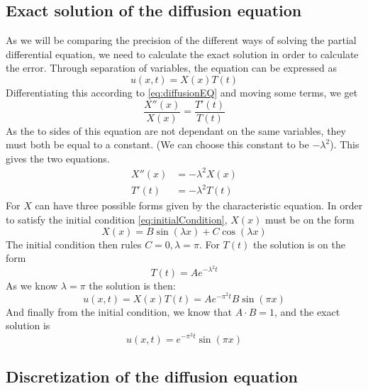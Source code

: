 \subsection{Exact solution of the diffusion equation}
As we will be comparing the precision of the different ways of solving the partial differential equation, we need to calculate the exact solution in order to calculate the error.
Through separation of variables, the equation can be expressed as
\begin{equation}
u(x,t) = X(x)T(t)
\label{eq:separated}
\end{equation}
Differentiating this according to \eqref{eq:diffusionEQ} and moving some terms, we get
\begin{equation*}
\frac{X''(x)}{X(x)} = \frac{T'(t)}{T(t)}
\end{equation*}
As the to sides of this equation are not dependant on the same variables, they must both be equal to a constant. (We can choose this constant to be $-\lambda ^2$). This gives the two equations.
\begin{equation*}
\begin{split}
X''(x) &= -\lambda ^2 X(x) \\
T'(t) &= -\lambda^2 T(t)
\end{split}
\end{equation*}
For $X$ can have three possible forms given by the characteristic equation. In order to satisfy the initial condition \eqref{eq:initialCondition}, $X(x)$ must be on the form
\begin{equation*}
X(x) = B\sin(\lambda x) + C\cos(\lambda x)
\end{equation*}
The initial condition then rules $C=0, \lambda = \pi$. For $T(t)$ the solution is on the form
\begin{equation*}
T(t) = Ae^{-\lambda^2t}
\end{equation*}
As we know $\lambda =\pi$ the solution is then:
\begin{equation*}
u(x,t) = X(x)T(t) = Ae^{-\pi^2 t}B\sin(\pi x)
\end{equation*}
And finally from the initial condition, we know that $A\cdot B = 1$, and the exact solution is
\begin{equation}
u(x,t) = e^{-\pi^2 t}\sin(\pi x)
\label{eq:exact}
\end{equation}

\subsection{Discretization of the diffusion equation}

